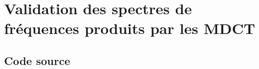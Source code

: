\documentclass{article}
\begin{document}

\newpage
\section{Validation des spectres de fréquences produits par les MDCT}\label{app:spectrum_comparison}
\subsection{Code source}\label{app:spectrum_comparison_code}
\end{document}

